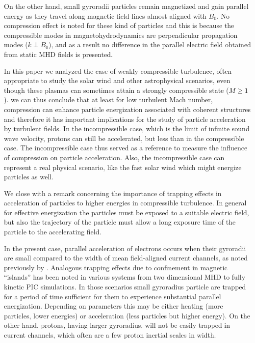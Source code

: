 \documentclass[%
aip,pop,amsmath,amssymb,
 reprint,%
]{revtex4-1}
\begin{document}
{{On the other hand, small gyroradii particles remain
magnetized and gain parallel energy as 
they travel along magnetic field lines almost aligned with $B_0$. No compression effect is
noted for these kind of particles and this is because the compressible modes in 
magnetohydrodynamics are perpendicular propagation modes ($k \perp B_0$), and as a result
no difference in the parallel electric field obtained from static MHD fields is presented.

In this paper we analyzed the case of weakly compressible turbulence, 
often appropriate to study the solar wind and other astrophysical scenarios, even though these plasmas
can sometimes attain a strongly compressible state 
($M \geq 1$). we can thus conclude that at least for low turbulent 
Mach number, compression can enhance particle energization associated 
with coherent structures and therefore it has important implications for the study of
particle acceleration by turbulent fields. In the incompressible case, which is the limit
of infinite sound wave velocity, protons can still be accelerated, but less than
in the compressible case. The incompressible case thus served as a reference to measure the
influence of compression on particle acceleration. Also, the incompressible case can 
represent a real physical scenario, like the fast solar wind which might energize particles as
well\cite{Bogdan2014}.

We close with a remark concerning the importance of trapping effects in acceleration of particles 
to higher energies in compressible turbulence. In general for effective energization the particles must be exposed to 
a suitable electric field, but also the trajectory of the particle must allow  
a long exposure time of the particle to the accelerating field. 

In the present case, parallel acceleration of electrons occurs when their gyroradii
are small compared to the width of mean field-aligned current channels, as noted previously by \citet{PD1}.
Analogous trapping effects due to confinement in magnetic ``islands'' has been noted in various systems from two dimensional  MHD
\cite{AmbrosianoEA88} to fully kinetic PIC simulations\cite{DrakeEA06}. In those scenarios small gyroradius particle are trapped
for a period of time sufficient for them to experience substantial parallel energization. Depending on parameters this may be 
either heating (more particles, lower energies) or acceleration (less particles but higher energy).
On the other hand, protons, having larger gyroradius, will not be easily trapped in current channels, 
which often are a few proton inertial scales in width. 

}}
\end{document}
